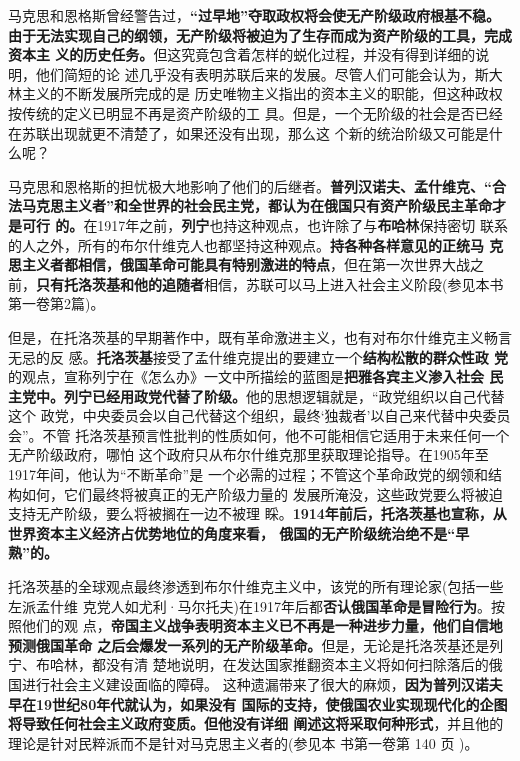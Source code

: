 马克思和恩格斯曾经警告过，\textbf{“过早地”夺取政权将会使无产阶级政府根基不稳。
  由于无法实现自己的纲领，无产阶级将被迫为了生存而成为资产阶级的工具，完成资本主
  义的历史任务。}但这究竟包含着怎样的蜕化过程，并没有得到详细的说明，他们简短的论
述几乎没有表明苏联后来的发展。尽管人们可能会认为，斯大林主义的不断发展所完成的是
历史唯物主义指出的资本主义的职能，但这种政权按传统的定义已明显不再是资产阶级的工
具。但是，一个无阶级的社会是否已经在苏联出现就更不清楚了，如果还没有出现，那么这
个新的统治阶级又可能是什么呢？

马克思和恩格斯的担忧极大地影响了他们的后继者。\textbf{普列汉诺夫、孟什维克、“合
  法马克思主义者”和全世界的社会民主党，都认为在俄国只有资产阶级民主革命才是可行
  的。}在1917年之前，\textbf{列宁}也持这种观点，也许除了与\textbf{布哈林}保持密切
联系的人之外，所有的布尔什维克人也都坚持这种观点。\textbf{持各种各样意见的正统马
  克思主义者都相信，俄国革命可能具有特别激进的特点}，但在第一次世界大战之
前，\textbf{只有托洛茨基和他的追随者}相信，苏联可以马上进入社会主义阶段(参见本书
第一卷第2篇)。
  
但是，在托洛茨基的早期著作中，既有革命激进主义，也有对布尔什维克主义畅言无忌的反
感。\textbf{托洛茨基}接受了孟什维克提出的要建立一个\textbf{结构松散的群众性政
  党}的观点，宣称列宁在《怎么办》一文中所描绘的蓝图是\textbf{把雅各宾主义渗入社会
  民主党中。列宁已经用政党代替了阶级。}他的思想逻辑就是，“政党组织以自己代替这个
政党，中央委员会以自己代替这个组织，最终‘独裁者’以自己来代替中央委员会”。不管
托洛茨基预言性批判的性质如何，他不可能相信它适用于未来任何一个无产阶级政府，哪怕
这个政府只从布尔什维克那里获取理论指导。在1905年至1917年间，他认为“不断革命”是
一个必需的过程；不管这个革命政党的纲领和结构如何，它们最终将被真正的无产阶级力量的
发展所淹没，这些政党要么将被迫支持无产阶级，要么将被搁在一边不被理
睬。\textbf{1914年前后，托洛茨基也宣称，从世界资本主义经济占优势地位的角度来看，
  俄国的无产阶级统治绝不是“早熟”的。}

托洛茨基的全球观点最终渗透到布尔什维克主义中，该党的所有理论家(包括一些左派孟什维
克党人如尤利·马尔托夫)在1917年后都\textbf{否认俄国革命是冒险行为}。按照他们的观
点，\textbf{帝国主义战争表明资本主义已不再是一种进步力量，他们自信地预测俄国革命
  之后会爆发一系列的无产阶级革命。}但是，无论是托洛茨基还是列宁、布哈林，都没有清
楚地说明，在发达国家推翻资本主义将如何扫除落后的俄国进行社会主义建设面临的障碍。
这种遗漏带来了很大的麻烦，\textbf{因为普列汉诺夫早在19世纪80年代就认为，如果没有
  国际的支持，使俄国农业实现现代化的企图将导致任何社会主义政府变质。但他没有详细
  阐述这将采取何种形式}，并且他的理论是针对民粹派而不是针对马克思主义者的(参见本
书第一卷第 140 页 )。


